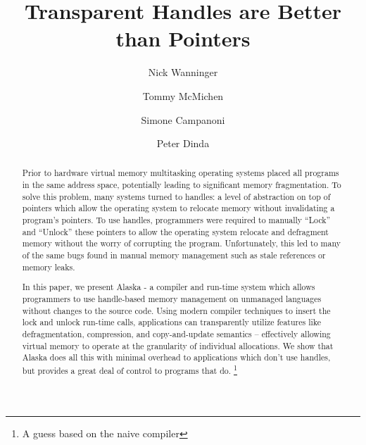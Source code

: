 \documentclass[sigplan,screen]{acmart}
\begin{document}
\title{Transparent Handles are Better than Pointers}

\author{Nick Wanninger}

\author{Tommy McMichen}


\author{Simone Campanoni}

\author{Peter Dinda}

\newcommand{\hbmm}{handle-based memory management~}

\begin{abstract}
Prior to hardware virtual memory multitasking operating systems placed all
programs in the same address space, potentially leading to significant memory
fragmentation. To solve this problem, many systems turned to handles: a level
of abstraction on top of pointers which allow the operating system to
relocate memory without invalidating a program's pointers. To use handles,
programmers were required to manually ``Lock'' and ``Unlock'' these pointers
to allow the operating system relocate and defragment memory without the
worry of corrupting the program. Unfortunately, this led to many of the same
bugs found in manual memory management such as stale references or memory
leaks.

In this paper, we present Alaska - a compiler and run-time system which allows
programmers to use handle-based memory management on unmanaged languages
without changes to the source code. Using modern compiler techniques to
insert the lock and unlock run-time calls, applications can transparently
utilize features like defragmentation, compression, and copy-and-update
semantics -- effectively allowing virtual memory to operate at the
granularity of individual allocations. We show that Alaska does all this with
minimal overhead to applications which don't use handles, but provides a
great deal of control to programs that do. \footnote{A guess based on the
naive compiler}


\end{abstract}


\maketitle
\end{document}

